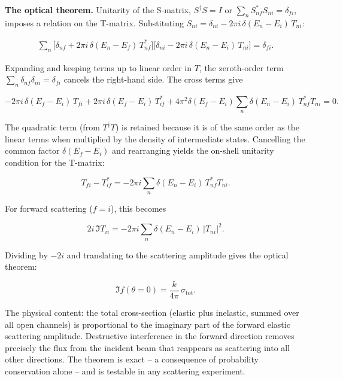 \medskip\noindent\textbf{The optical theorem.}
Unitarity of the S-matrix, $S^{\dagger}S = I$ or $\sum_{n}S_{nf}^{*}S_{ni} = \delta_{fi}$, imposes a relation on the T-matrix. Substituting $S_{ni} = \delta_{ni} - 2\pi i\,\delta(E_{n}-E_{i})\,T_{ni}$:
\begin{linenomath}
\begin{align*}
\sum_{n}\bigl[\delta_{nf} + 2\pi i\,\delta(E_{n}-E_{f})\,T_{nf}^{*}\bigr]
      \bigl[\delta_{ni} - 2\pi i\,\delta(E_{n}-E_{i})\,T_{ni}\bigr] = \delta_{fi}.
\end{align*}
\end{linenomath}
Expanding and keeping terms up to linear order in $T$, the zeroth-order term $\sum_{n}\delta_{nf}\delta_{ni} = \delta_{fi}$ cancels the right-hand side. The cross terms give
\begin{linenomath}
\begin{equation*}
-2\pi i\,\delta(E_{f}-E_{i})\,T_{fi}
+ 2\pi i\,\delta(E_{f}-E_{i})\,T_{if}^{*}
+ 4\pi^{2}\delta(E_{f}-E_{i})\sum_{n}\delta(E_{n}-E_{i})\,T_{nf}^{*}T_{ni} = 0.
\end{equation*}
\end{linenomath}
The quadratic term (from $T^{\dagger}T$) is retained because it is of the same order as the linear terms when multiplied by the density of intermediate states. Cancelling the common factor $\delta(E_{f}-E_{i})$ and rearranging yields the on-shell unitarity condition for the T-matrix:
\begin{linenomath}
\begin{equation*}
T_{fi} - T_{if}^{*} = -2\pi i\sum_{n}\delta(E_{n}-E_{i})\,T_{nf}^{*}T_{ni}.
\end{equation*}
\end{linenomath}
For forward scattering ($f = i$), this becomes
\begin{linenomath}
\begin{equation*}
2i\,\Im T_{ii} = -2\pi i\sum_{n}\delta(E_{n}-E_{i})\,|T_{ni}|^{2}.
\end{equation*}
\end{linenomath}
Dividing by $-2i$ and translating to the scattering amplitude gives the optical theorem:
\begin{linenomath}
\begin{equation}
\Im f(\theta=0) = \frac{k}{4\pi}\,\sigma_{\text{tot}}.
\label{eq:optical-theorem}
\end{equation}
\end{linenomath}
The physical content: the total cross-section (elastic plus inelastic, summed over all open channels) is proportional to the imaginary part of the forward elastic scattering amplitude. Destructive interference in the forward direction removes precisely the flux from the incident beam that reappears as scattering into all other directions. The theorem is exact -- a consequence of probability conservation alone -- and is testable in any scattering experiment.

